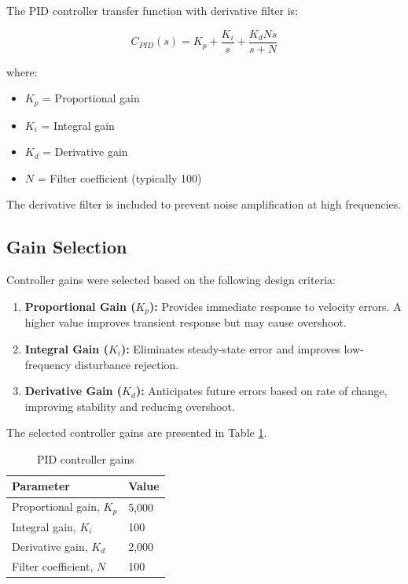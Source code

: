 \documentclass[12pt,a4paper]{article}
\begin{document}
The PID controller transfer function with derivative filter is:

\begin{equation}
    C_{PID}(s) = K_p + \frac{K_i}{s} + \frac{K_d N s}{s + N}
    \label{eq:pid}
\end{equation}

where:
\begin{itemize}
    \item $K_p$ = Proportional gain
    \item $K_i$ = Integral gain
    \item $K_d$ = Derivative gain
    \item $N$ = Filter coefficient (typically 100)
\end{itemize}

The derivative filter is included to prevent noise amplification at high frequencies.

\subsection{Gain Selection}

Controller gains were selected based on the following design criteria:

\begin{enumerate}
    \item \textbf{Proportional Gain ($K_p$):} Provides immediate response to velocity errors. A higher value improves transient response but may cause overshoot.
    
    \item \textbf{Integral Gain ($K_i$):} Eliminates steady-state error and improves low-frequency disturbance rejection.
    
    \item \textbf{Derivative Gain ($K_d$):} Anticipates future errors based on rate of change, improving stability and reducing overshoot.
\end{enumerate}

The selected controller gains are presented in Table \ref{tab:gains}.

\begin{table}[H]
\centering
\caption{PID controller gains}
\label{tab:gains}
\begin{tabular}{@{}ll@{}}
\toprule
\textbf{Parameter} & \textbf{Value} \\ \midrule
Proportional gain, $K_p$ & 5,000 \\
Integral gain, $K_i$ & 100 \\
Derivative gain, $K_d$ & 2,000 \\
Filter coefficient, $N$ & 100 \\ \bottomrule
\end{tabular}
\end{table}
\end{document}
